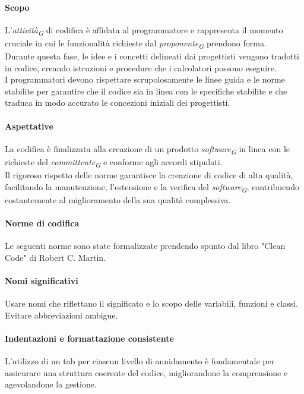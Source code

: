 \paragraph{Scopo}
L'\textit{attività}\textsubscript{\textit{G}} di codifica è affidata al programmatore e rappresenta il momento cruciale in cui le funzionalità richieste dal \textit{proponente}\textsubscript{\textit{G}} prendono forma. \\
Durante questa fase, le idee e i concetti delineati dai progettisti vengono tradotti in codice, creando istruzioni e procedure che i calcolatori possono eseguire. \\
I programmatori devono rispettare scrupolosamente le linee guida e le norme stabilite per garantire che il codice sia in linea con le specifiche stabilite e che traduca in modo accurato le concezioni iniziali dei progettisti.
\paragraph{Aspettative}
La codifica è finalizzata alla creazione di un prodotto \textit{software}\textsubscript{\textit{G}} in linea con le richieste del \textit{committente}\textsubscript{\textit{G}} e conforme agli accordi stipulati.\\
Il rigoroso rispetto delle norme garantisce la creazione di codice di alta qualità, facilitando la manutenzione, l'estensione e la verifica del \textit{software}\textsubscript{\textit{G}}, contribuendo costantemente al miglioramento della sua qualità complessiva.
\paragraph{Norme di codifica}
Le seguenti norme sono state formalizzate prendendo spunto dal libro "Clean Code" di Robert C. Martin.

\paragraph{Nomi significativi}
Usare nomi che riflettano il significato e lo scopo delle variabili, funzioni e classi. Evitare abbreviazioni ambigue.
\paragraph{Indentazioni e formattazione consistente}
L'utilizzo di un tab per ciascun livello di annidamento è fondamentale per assicurare una struttura coerente del codice, migliorandone la comprensione e agevolandone la gestione.
